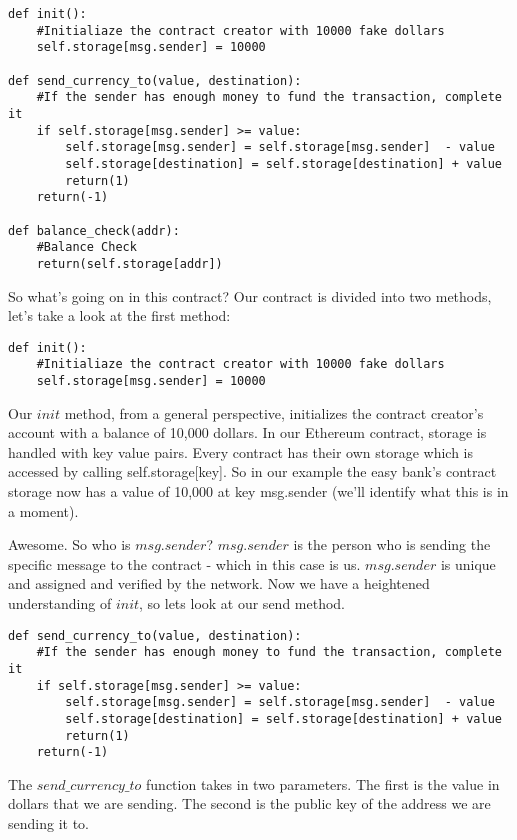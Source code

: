 \documentclass[12pt]{article}
\begin{document}
\begin{mdframed}
\begin{verbatim}
def init():
	#Initialiaze the contract creator with 10000 fake dollars
	self.storage[msg.sender] = 10000

def send_currency_to(value, destination):
	#If the sender has enough money to fund the transaction, complete it
	if self.storage[msg.sender] >= value:
		self.storage[msg.sender] = self.storage[msg.sender]  - value
		self.storage[destination] = self.storage[destination] + value
		return(1)
	return(-1)

def balance_check(addr):
	#Balance Check
	return(self.storage[addr])
\end{verbatim}
\end{mdframed}
		
		
So what's going on in this contract?
Our contract is divided into two methods, let's take a look at the first method:

\begin{verbatim}
def init():
	#Initialiaze the contract creator with 10000 fake dollars
	self.storage[msg.sender] = 10000
\end{verbatim}
 
Our $init$ method, from a general perspective, initializes the contract creator's account with a balance of 10,000 dollars. In our Ethereum contract, storage is handled with key value pairs. Every contract has their own storage which is accessed by calling self.storage[key]. So in our example the easy bank's contract storage now has a value of 10,000 at key msg.sender (we'll identify what this is in a moment).

 Awesome. So who is $msg.sender$? $msg.sender$ is the person who is sending the specific message to the contract - which in this case is us. $msg.sender$ is unique and assigned and verified by the network. Now we have a heightened understanding of $init$, so lets look at our send method.

\begin{verbatim}
def send_currency_to(value, destination):
	#If the sender has enough money to fund the transaction, complete it
	if self.storage[msg.sender] >= value:
		self.storage[msg.sender] = self.storage[msg.sender]  - value
		self.storage[destination] = self.storage[destination] + value
		return(1)
	return(-1)
\end{verbatim}

The $send\_currency\_to$ function takes in two parameters. The first is the value in dollars that we are sending. The second is the public key of the address we are sending it to. 
\end{document}
